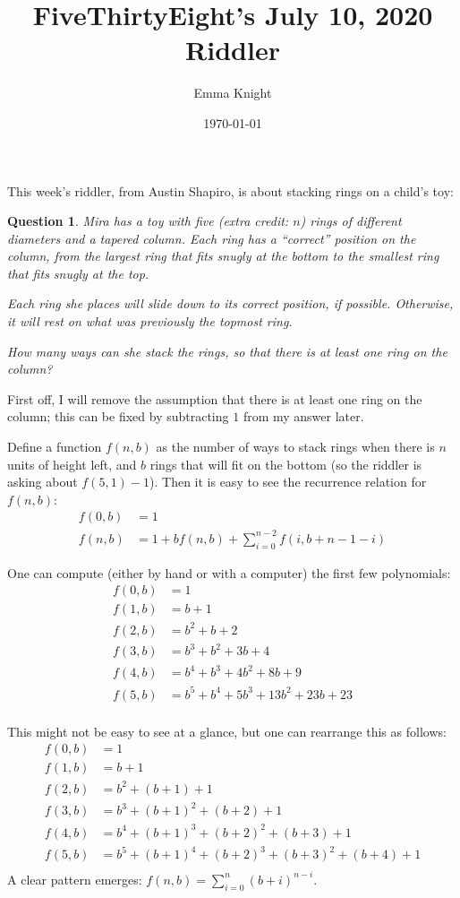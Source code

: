 \documentclass[11pt]{article}
\title{FiveThirtyEight's July 10, 2020 Riddler}
\author{Emma Knight}
\date{\today}
\newtheorem{question}[theorem]{Question}
\theoremstyle{definition}
\begin{document}
\maketitle
This week's riddler, from Austin Shapiro, is about stacking rings on a child's toy:

\begin{question}
Mira has a toy with five (extra credit: $n$) rings of different diameters and a tapered column. Each ring has a ``correct'' position on the column, from the largest ring that fits snugly at the bottom to the smallest ring that fits snugly at the top.

Each ring she places will slide down to its correct position, if possible. Otherwise, it will rest on what was previously the topmost ring.

How many ways can she stack the rings, so that there is at least one ring on the column?
\end{question}
First off, I will remove the assumption that there is at least one ring on the column; this can be fixed by subtracting $1$ from my answer later.

Define a function $f(n, b)$ as the number of ways to stack rings when there is $n$ units of height left, and $b$ rings that will fit on the bottom (so the riddler is asking about $f(5, 1)-1$).  Then it is easy to see the recurrence relation for $f(n, b)$:
\begin{align*}
f(0, b) & = 1 \\
f(n, b) & = 1 + bf(n, b) + \sum_{i = 0}^{n-2} f(i, b+n-1-i)
\end{align*}

One can compute (either by hand or with a computer) the first few polynomials:
\begin{align*}
f(0, b) & = 1 \\
f(1, b) & = b + 1 \\
f(2, b) & = b^2 + b + 2 \\
f(3, b) & = b^3  + b^2 +  3b  + 4 \\
f(4, b) & = b^4  + b^3 +  4b^2  + 8b  + 9 \\
f(5, b) & =  b^5  + b^4 + 5b^3  + 13b^2  + 23b  + 23 \\
\end{align*}

This might not be easy to see at a glance, but one can rearrange this as follows:
\begin{align*}
f(0, b) & = 1 \\
f(1, b) & = b + 1 \\
f(2, b) & = b^2 + (b + 1) + 1 \\
f(3, b) & = b^3  + (b+1)^2 +  (b+2)  + 1 \\
f(4, b) & = b^4  + (b+1)^3 + (b+2)^2  + (b+3)  + 1 \\
f(5, b) & =  b^5  + (b+1)^4 + (b+2)^3  + (b+3)^2  + (b+4)  + 1 \\
\end{align*}
A clear pattern emerges: $f(n, b) = \displaystyle{\sum_{i = 0}^{n}} (b+i)^{n-i}$.
\end{document}
